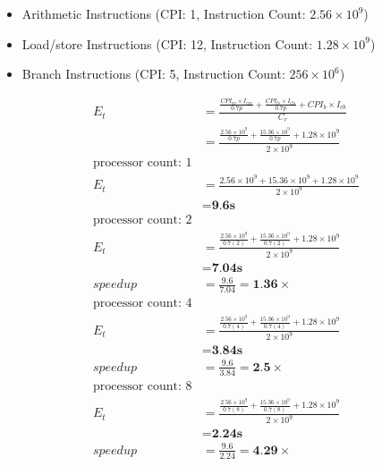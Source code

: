 \documentclass[10pt]{article}
\begin{document}
\begin{enumerate}
\begin{enumerate}
        \begin{itemize}
            \item Arithmetic Instructions (CPI: 1, Instruction Count: $2.56\times10^9$)
            \item Load/store Instructions (CPI: 12, Instruction Count: $1.28\times10^9$)
            \item Branch Instructions (CPI: 5, Instruction Count: $256\times10^6$)
        \end{itemize}
        \begin{align*}
            E_t &= \frac{\frac{CPI_{ar} \times I_{car}}{0.7p} + \frac{CPI_{ls} \times I_{cls}}{0.7p} + CPI_b \times I_{cb}}{C_r}\\
            &= \frac{\frac{2.56 \times 10^9}{0.7p} + \frac{15.36 \times 10^9}{0.7p} + 1.28 \times 10^9}{2 \times 10^9}\\
            \text{processor count: 1}\\
            E_t &= \frac{2.56 \times 10^9 + 15.36 \times 10^9 + 1.28 \times 10^9}{2 \times 10^9}\\
            &= \textbf{9.6s}\\
            \text{processor count: 2}\\
            E_t &= \frac{\frac{2.56 \times 10^9}{0.7(2)} + \frac{15.36 \times 10^9}{0.7(2)} + 1.28 \times 10^9}{2 \times 10^9}\\
            &= \textbf{7.04s}\\
            speedup &= \frac{9.6}{7.04} = \textbf{1.36}\times\\
            \text{processor count: 4}\\
            E_t &= \frac{\frac{2.56 \times 10^9}{0.7(4)} + \frac{15.36 \times 10^9}{0.7(4)} + 1.28 \times 10^9}{2 \times 10^9}\\
            &= \textbf{3.84s}\\
            speedup &= \frac{9.6}{3.84} = \textbf{2.5}\times\\
            \text{processor count: 8}\\
            E_t &= \frac{\frac{2.56 \times 10^9}{0.7(8)} + \frac{15.36 \times 10^9}{0.7(8)} + 1.28 \times 10^9}{2 \times 10^9}\\
            &= \textbf{2.24s}\\
            speedup &= \frac{9.6}{2.24} = \textbf{4.29}\times\\
        \end{align*}

\end{enumerate}
\end{enumerate}
\end{document}
